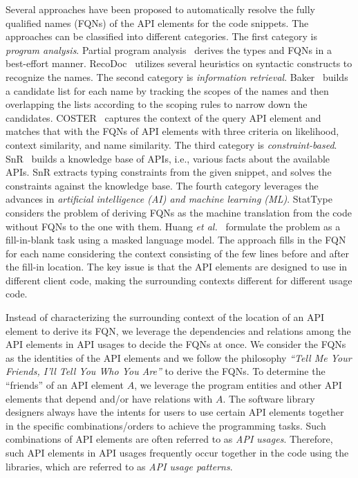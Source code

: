Several approaches have been proposed to automatically resolve the
fully qualified names (FQNs) of the API elements for the code
snippets.  The approaches can be classified into different
categories. The first category is {\em program analysis}. Partial
program analysis~\cite{dagenais-oopsla08} derives the types and FQNs
in a best-effort manner. RecoDoc~\cite{dagenais-icse12} utilizes
several heuristics on syntactic constructs to recognize the names.
The second category is {\em information
  retrieval}. Baker~\cite{liveapi14} builds a candidate list for each
name by tracking the scopes of the names and then overlapping the
lists according to the scoping rules to narrow down the candidates.
COSTER~\cite{coster-ase19} captures the context of the query API
element and matches that with the FQNs of API elements with three
criteria on likelihood, context similarity, and name similarity.  The
third category is {\em constraint-based}.  SnR~\cite{snr-icse22}
builds a knowledge base of APIs, i.e., various facts about the
available APIs.  SnR extracts typing constraints from the given
snippet, and solves the constraints against the knowledge base. The
fourth category leverages the advances in {\em artificial intelligence
  (AI) and machine learning (ML)}. StatType~\cite{icse18} considers
the problem of deriving FQNs as the machine translation from the code
without FQNs to the one with them. Huang {\em et
  al.}~\cite{prompt-ase22} formulate the problem as a fill-in-blank
task using a masked language model. The approach fills in the FQN for
each name considering the context consisting of the few lines before
and after the fill-in location.  The key issue is that the API
elements are designed to use in different client code, making the
surrounding contexts different for different usage code.

Instead of characterizing the surrounding context of the location of
an API element to derive its FQN, we leverage the dependencies and
relations among the API elements in API usages to decide the FQNs at
once. We consider the FQNs as the identities of the API elements and
we follow the philosophy {\em ``Tell Me Your Friends, I'll Tell You
  Who You Are''} to derive the FQNs. To determine the ``friends'' of
an API element $A$, we leverage the program entities and other API
elements that depend and/or have relations with $A$. The software
library designers always have the intents for users to use certain API
elements together in the specific combinations/orders to achieve the
programming tasks. Such combinations of API elements are often
referred to as {\em API usages}. Therefore, such API elements in API
usages frequently occur together in the code using the libraries,
which are referred to as {\em API usage patterns}.

